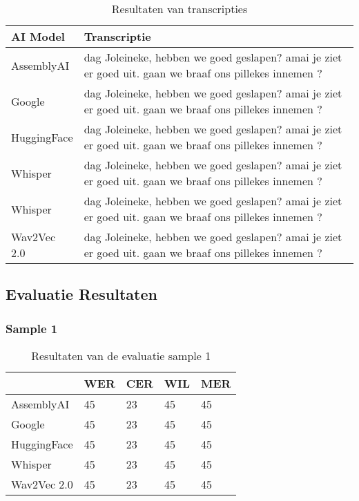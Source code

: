 \begin{table}[htbp]
    \centering
    \label{tab:results_sample6}
    \begin{tabularx}{\textwidth}{|l|X|}
        \hline
        \textbf{AI Model} & \textbf{Transcriptie} \\ \midrule
        
        AssemblyAI & dag Joleineke, hebben we goed geslapen? amai je ziet er goed uit. gaan we braaf ons pillekes innemen ? \\ \hline
        
        Google & dag Joleineke, hebben we goed geslapen? amai je ziet er goed uit. gaan we braaf ons pillekes innemen ? \\ \hline
        
        HuggingFace & dag Joleineke, hebben we goed geslapen? amai je ziet er goed uit. gaan we braaf ons pillekes innemen ? \\ \hline
        
        Whisper & dag Joleineke, hebben we goed geslapen? amai je ziet er goed uit. gaan we braaf ons pillekes innemen ? \\ \hline
        
        Whisper & dag Joleineke, hebben we goed geslapen? amai je ziet er goed uit. gaan we braaf ons pillekes innemen ? \\ \hline
        
        Wav2Vec 2.0 & dag Joleineke, hebben we goed geslapen? amai je ziet er goed uit. gaan we braaf ons pillekes innemen ? \\ \hline
    \end{tabularx}
    \caption{Resultaten van transcripties}
\end{table}
\FloatBarrier

\pagebreak

\subsection{Evaluatie Resultaten}
\subsubsection{Sample 1}
\begin{table}[htbp]
    \centering
    \caption{Resultaten van de evaluatie sample 1}
    \label{tab:results_sample1}
    \begin{tabularx}{\textwidth}{|l|X|X|X|X|}
        \hline
        & \textbf{WER} & \textbf{CER} & \textbf{WIL} & \textbf{MER} \\ \hline
        AssemblyAI & 45 & 23 & 45 & 45 \\ \hline
        Google & 45 & 23 & 45 & 45 \\ \hline
        HuggingFace & 45 & 23 & 45 & 45 \\ \hline
        Whisper & 45 & 23 & 45 & 45 \\ \hline
        Wav2Vec 2.0 & 45 & 23 & 45 & 45 \\ \hline
    \end{tabularx}
\end{table}
\FloatBarrier


